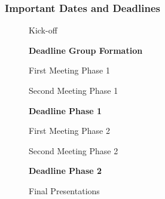 \begin{frame}[label={important_deadlines}]
  \frametitle{Important Dates and Deadlines}

  \begin{description}
    \item[\dateKickoffPhaseOne] Kick-off
    \item[\dateDeadlinePhaseZero] \textbf{Deadline Group Formation}
    \item[\dateDeadlinePhaseOneFirstMeeting] First Meeting Phase 1
    \item[\dateDeadlinePhaseOneSecondMeeting] Second Meeting Phase 1
    \item[\dateDeadlinePhaseOne] \textbf{Deadline Phase 1}
    \item[\dateDeadlinePhaseTwoFirstMeeting] First Meeting Phase 2
    \item[\dateDeadlinePhaseTwoSecondMeeting] Second Meeting Phase 2
    \item[\dateDeadlinePhaseTwo] \textbf{Deadline Phase 2}
    \item[\dateFinal] Final Presentations%
  \end{description}
  \vfill
\end{frame}
